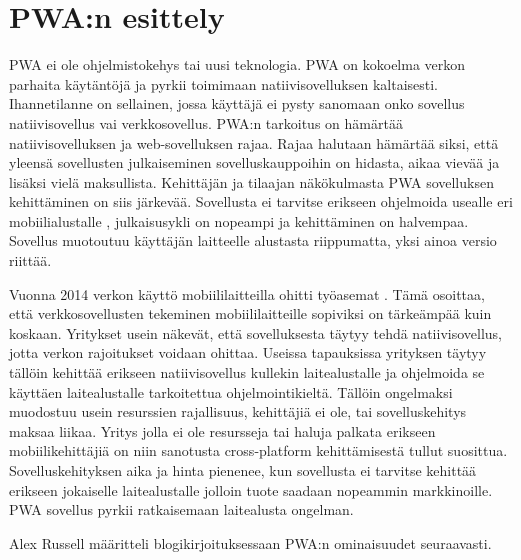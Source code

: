 \documentclass{tktltiki}
\begin{document}
\newpage
\section{PWA:n esittely}

PWA ei ole ohjelmistokehys tai uusi teknologia. PWA on kokoelma verkon parhaita käytäntöjä \cite{Kapoor} ja pyrkii toimimaan natiivisovelluksen kaltaisesti. Ihannetilanne on sellainen, jossa käyttäjä ei pysty sanomaan onko sovellus natiivisovellus vai verkkosovellus. PWA:n tarkoitus on hämärtää natiivisovelluksen ja web-sovelluksen rajaa. Rajaa halutaan hämärtää siksi, että yleensä sovellusten julkaiseminen sovelluskauppoihin on hidasta, aikaa vievää ja lisäksi vielä maksullista. Kehittäjän ja tilaajan näkökulmasta PWA sovelluksen kehittäminen on siis järkevää. Sovellusta ei tarvitse erikseen ohjelmoida usealle eri mobiilialustalle \cite{Gazdecki}, julkaisusykli on nopeampi ja kehittäminen on halvempaa. Sovellus muotoutuu käyttäjän laitteelle alustasta riippumatta, yksi ainoa versio riittää. 

Vuonna 2014 verkon käyttö mobiililaitteilla ohitti työasemat \cite{tandelimpact}. Tämä osoittaa, että verkkosovellusten tekeminen mobiililaitteille sopiviksi on tärkeämpää kuin koskaan. Yritykset usein näkevät, että sovelluksesta täytyy tehdä natiivisovellus, jotta verkon rajoitukset voidaan ohittaa. Useissa tapauksissa yrityksen täytyy tällöin kehittää erikseen natiivisovellus kullekin laitealustalle ja ohjelmoida se käyttäen laitealustalle tarkoitettua ohjelmointikieltä. Tällöin ongelmaksi muodostuu usein resurssien rajallisuus, kehittäjiä ei ole, tai sovelluskehitys maksaa liikaa. Yritys jolla ei ole resursseja tai haluja palkata erikseen mobiilikehittäjiä on niin sanotusta cross-platform kehittämisestä tullut suosittua. \cite{biorn2017progressive} Sovelluskehityksen aika ja hinta pienenee, kun sovellusta ei tarvitse kehittää erikseen jokaiselle laitealustalle jolloin tuote saadaan nopeammin markkinoille. PWA sovellus pyrkii ratkaisemaan laitealusta ongelman.

Alex Russell määritteli blogikirjoituksessaan PWA:n ominaisuudet seuraavasti. 
\end{document}
